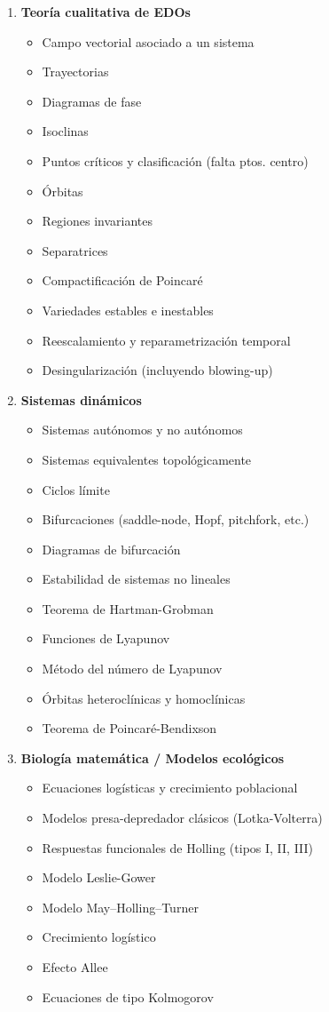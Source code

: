 \begin{enumerate}
	\item \textbf{Teoría cualitativa de EDOs}
	\begin{itemize}
		\item Campo vectorial asociado a un sistema \checkmark
		\item Trayectorias \checkmark
		\item Diagramas de fase \checkmark
		\item Isoclinas \checkmark
		\item Puntos críticos y clasificación \checkmark (falta ptos. centro)
		\item Órbitas
		\item Regiones invariantes
		\item Separatrices
		\item Compactificación de Poincaré
		\item Variedades estables e inestables
		\item Reescalamiento y reparametrización temporal
		\item Desingularización (incluyendo blowing-up)
	\end{itemize}
	
	\item \textbf{Sistemas dinámicos}
	\begin{itemize}
		\item Sistemas autónomos y no autónomos \checkmark
		\item Sistemas equivalentes topológicamente \checkmark
		\item Ciclos límite \checkmark
		\item Bifurcaciones (saddle-node, Hopf, pitchfork, etc.)
		\item Diagramas de bifurcación
		\item Estabilidad de sistemas no lineales
		\item Teorema de Hartman-Grobman \checkmark
		\item Funciones de Lyapunov
		\item Método del número de Lyapunov
		\item Órbitas heteroclínicas y homoclínicas
		\item Teorema de Poincaré-Bendixson
	\end{itemize}
	
	\item \textbf{Biología matemática / Modelos ecológicos}
	\begin{itemize}
		\item Ecuaciones logísticas y crecimiento poblacional
		\item Modelos presa-depredador clásicos (Lotka-Volterra)
		\item Respuestas funcionales de Holling (tipos I, II, III)
		\item Modelo Leslie-Gower
		\item Modelo May–Holling–Turner
		\item Crecimiento logístico
		\item Efecto Allee
		\item Ecuaciones de tipo Kolmogorov
	\end{itemize}
	

\end{enumerate}
